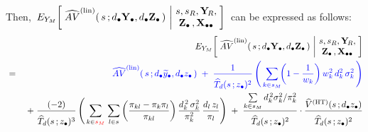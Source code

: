 \begin{lemma}
\begin{enumerate}
\begin{eqnarray*}
    \end{eqnarray*}
    Then,
    \,$
    E_{Y_{M}}\!\left[\;
        \widehat{AV}^{\textnormal{(lin)}}(\,s\,;d_{\bullet}\mathbf{Y}_{\bullet},d_{\bullet}\mathbf{Z}_{\bullet}\,)
        \,\left\vert\!
        \begin{array}{c} s,s_{R},\mathbf{Y}_{\!R}, \\ \mathbf{Z}_{\bullet}\,,\mathbf{X}_{\bullet\bullet} \end{array}
        \right.
        \!\!\right]
    $\,
    can be expressed as follows:
    \begin{eqnarray*}
    &&
        E_{Y_{M}}\!\left[\;
            \widehat{AV}^{\textnormal{(lin)}}(\,s\,;\dbullet\Ydot,\dbullet\Zdot\,)
            \,\left\vert\!
            \begin{array}{c} s,s_{R},\YsubR, \\ \Zdot\,,\Xobs \end{array}
            \right.
            \!\!\right]
    \\
    & = &
        {\color{blue}
        \widehat{AV}^{\textnormal{(lin)}}(\,s\,;\dbullet\widetilde{y}_{\bullet},\dbullet\zdot\,)
        \; + \;
        \dfrac{
            1
            }{
            \overset{{\color{white}.}}{
                \widehat{T}_{d}(s\,;\zdot)^{2}
                }
            }
        \left(\,
            \underset{k \in s_{M}}{\sum}\!\!
            \left(1-\dfrac{1}{w_{k}}\right)
            w_{k}^{2}\,d_{k}^{2}\,\sigma_{k}^{2}
            \,\right)
        }
    \\
    &&
        \; + \;
        \dfrac{
            (-2)
            }{
            \overset{{\color{white}.}}{
                \widehat{T}_{d}(s\,;\zdot)^{3}
                }
            }
        \left(\,
            \underset{k \in {\color{red}s_{M}}}{\sum}\;
            \underset{l \in s}{\sum}
                \left(\dfrac{\pi_{kl}-\pi_{k}\pi_{l}}{\pi_{kl}}\right)
                \dfrac{d_{k}^{\,2}\,\sigma^{2}_{k}}{\pi_{k}^{2}}\,
                \dfrac{d_{l}\,z_{l}}{\pi_{l}}
            \right)
        \; + \;
        \dfrac{
            \underset{k \in s_{M}}{\sum}\,d_{k}^{\,2}\sigma^{2}_{k}/\pi_{k}^{2}
            }{
            \overset{{\color{white}.}}{
                \widehat{T}_{d}(s\,;\zdot)^{2}
                }
            }
        \cdot
        \dfrac{
            \widehat{V}^{\textnormal{(HT)}}(s\,;\dbullet\zdot)
            }{
            \overset{{\color{white}.}}{
                \widehat{T}_{d}(s\,;\zdot)^{2}
                }
            }
    \end{eqnarray*}
\end{enumerate}
\end{lemma}
